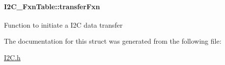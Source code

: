 \paragraph[{transfer\+Fxn}]{ I2\+C\+\_\+\+Fxn\+Table\+::transfer\+Fxn}\label{struct_i2_c___fxn_table_a16048b22814e3d123f82a7674599b15c}
Function to initiate a I2\+C data transfer 

The documentation for this struct was generated from the following file\+:\begin{DoxyCompactItemize}
\item 
\hyperlink{_i2_c_8h}{I2\+C.\+h}\end{DoxyCompactItemize}

